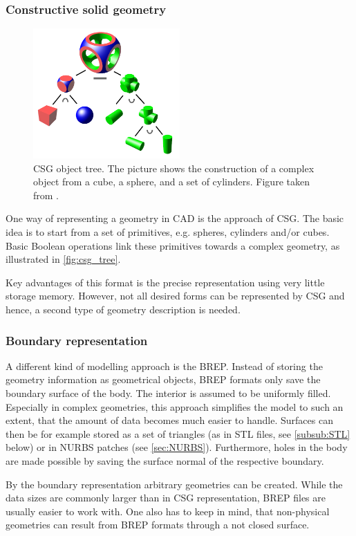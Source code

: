 \subsubsection{Constructive solid geometry}
\begin{figure}
\centering
\includegraphics[width=0.5\textwidth]{Pictures/Csg_tree.png}
\caption{CSG object tree. The picture shows the construction of a complex object from a cube, a sphere, and a set of cylinders. Figure taken from \cite{WikipediaCSG}.}
\label{fig:csg_tree}
\end{figure}
One way of representing a geometry in CAD is the approach of CSG. The basic idea is to start from a set of primitives, e.g. spheres, cylinders and/or cubes. Basic Boolean operations link these primitives towards a complex geometry, as illustrated in \autoref{fig:csg_tree}.

Key advantages of this format is the precise representation using very little storage memory. However, not all desired forms can be represented by CSG and hence, a second type of geometry description is needed. 
\subsubsection{Boundary representation}
A different kind of modelling approach is the BREP. Instead of storing the geometry information as geometrical objects, BREP formats only save the boundary surface of the body. The interior is assumed to be uniformly filled. Especially in complex geometries, this approach simplifies the model to such an extent, that the amount of data becomes much easier to handle. Surfaces can then be for example stored as a set of triangles (as in STL files, see \autoref{subsub:STL} below) or in NURBS patches (see \autoref{sec:NURBS}).
Furthermore, holes in the body are made possible by saving the surface normal of the respective boundary. 

By the boundary representation arbitrary geometries can be created. While the data sizes are commonly larger than in CSG representation, BREP files are usually easier to work with. One also has to keep in mind, that non-physical geometries can result from BREP formats through a not closed surface.
